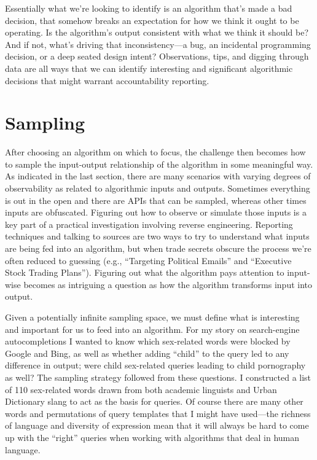 Essentially what we're looking to identify is an algorithm that's made a bad decision, that somehow breaks an expectation for how we think it ought to be operating. Is the algorithm's output consistent with what we think it should be? And if not, what's driving that inconsistency—a bug, an incidental programming decision, or a deep seated design intent? Observations, tips, and digging through data are all ways that we can identify interesting and significant algorithmic decisions that might warrant accountability reporting.

\section{Sampling }
After choosing an algorithm on which to focus, the challenge then becomes how to sample the input-output relationship of the algorithm in some meaningful way. As indicated in the last section, there are many scenarios with varying degrees of observability as related to algorithmic inputs and outputs. Sometimes everything is out in the open and there are APIs that can be sampled, whereas other times inputs are obfuscated. Figuring out how to observe or simulate those inputs is a key part of a practical investigation involving reverse engineering. Reporting techniques and talking to sources are two ways to try to understand what inputs are being fed into an algorithm, but when trade secrets obscure the process we're often reduced to guessing (e.g., ``Targeting Political Emails'' and ``Executive Stock Trading Plans''). Figuring out what the algorithm pays attention to input-wise becomes as intriguing a question as how the algorithm transforms input into output. 

Given a potentially infinite sampling space, we must define what is interesting and important for us to feed into an algorithm. For my story on search-engine autocompletions I wanted to know which sex-related words were blocked by Google and Bing, as well as whether adding ``child'' to the query led to any difference in output; were child sex-related queries leading to child pornography as well? The sampling strategy followed from these questions. I constructed a list of 110 sex-related words drawn from both academic linguists and Urban Dictionary slang to act as the basis for queries. Of course there are many other words and permutations of query templates that I might have used—the richness of language and diversity of expression mean that it will always be hard to come up with the ``right'' queries when working with algorithms that deal in human language. 

